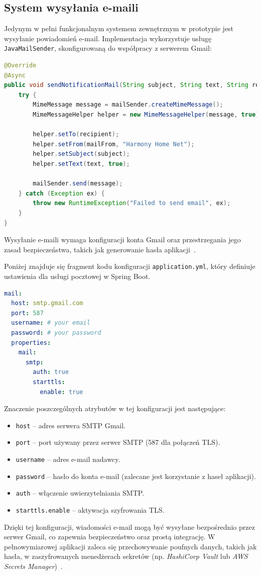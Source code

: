 \subsection{System wysyłania e-maili}

Jedynym w pełni funkcjonalnym systemem zewnętrznym w prototypie jest wysyłanie powiadomień e-mail. Implementacja wykorzystuje usługę \texttt{JavaMailSender}, skonfigurowaną do współpracy z serwerem Gmail:

\begin{lstlisting}[language=Java, style=JavaStyle, caption=Fragment klasy \texttt{MailServiceImp}]
@Override
@Async
public void sendNotificationMail(String subject, String text, String recipient) {
    try {
        MimeMessage message = mailSender.createMimeMessage();
        MimeMessageHelper helper = new MimeMessageHelper(message, true);

        helper.setTo(recipient);
        helper.setFrom(mailFrom, "Harmony Home Net");
        helper.setSubject(subject);
        helper.setText(text, true);

        mailSender.send(message);
    } catch (Exception ex) {
        throw new RuntimeException("Failed to send email", ex);
    }
}
\end{lstlisting}

Wysyłanie e-maili wymaga konfiguracji konta Gmail oraz przestrzegania jego zasad bezpieczeństwa, takich jak generowanie hasła aplikacji~\cite{gmail_api}.

Poniżej znajduje się fragment kodu konfiguracji \texttt{application.yml}, który definiuje ustawienia dla usługi pocztowej w Spring Boot.

\begin{lstlisting}[language=yaml, caption=Fragment konfiguracji poczty w \texttt{application.yml}]
mail:
  host: smtp.gmail.com
  port: 587
  username: # your email
  password: # your password
  properties:
    mail:
      smtp:
        auth: true
        starttls:
          enable: true
\end{lstlisting}

Znaczenie poszczególnych atrybutów w tej konfiguracji jest następujące:
\begin{itemize}
    \item \texttt{host} -- adres serwera SMTP Gmail.
    \item \texttt{port} -- port używany przez serwer SMTP (587 dla połączeń TLS).
    \item \texttt{username} -- adres e-mail nadawcy.
    \item \texttt{password} -- hasło do konta e-mail (zalecane jest korzystanie z haseł aplikacji).
    \item \texttt{auth} -- włączenie uwierzytelniania SMTP.
    \item \texttt{starttls.enable} -- aktywacja szyfrowania TLS.
\end{itemize}
Dzięki tej konfiguracji, wiadomości e-mail mogą być wysyłane bezpośrednio przez serwer Gmail, co zapewnia bezpieczeństwo oraz prostą integrację. W pełnowymiarowej aplikacji zaleca się przechowywanie poufnych danych, takich jak hasła, w zaszyfrowanych menedżerach sekretów 
(np. \emph{HashiCorp Vault} lub \emph{AWS Secrets Manager})~\cite{hashicorp_vault, aws_secret}.


